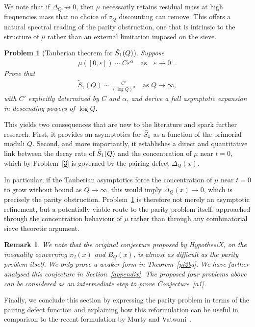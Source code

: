 \documentclass[11pt,reqno]{amsart}
\theoremstyle{plain}\newtheorem{theorem}{Theorem}[section]
\newtheorem{remark}{Remark}[section]
\newtheorem{problem}{Problem}[section]
\numberwithin{equation}{section}
\begin{document}
We note that if $\Delta_Q\not\to 0$, then $\mu$ necessarily retains residual mass at high frequencies mass that no choice of $\sigma_Q$ discounting can remove. This offers a natural spectral reading of the parity obstruction, one that is intrinsic to the structure of $\mu$ rather than an external limitation imposed on the sieve.

\begin{problem}[Tauberian theorem for $\Tilde{S}_1(Q)$]\label{4}
Suppose
\begin{align*}
\mu([0,\varepsilon]) \sim C \varepsilon^\alpha \quad \text{as}\quad \varepsilon \to 0^{+}.    
\end{align*}
Prove that
\begin{align*}
\widetilde{S}_1(Q) \sim \frac{C'}{(\log Q)^\alpha} \quad \text{as } Q \to \infty,    
\end{align*}
with $C'$ explicitly determined by $C$ and $\alpha$, and derive a full asymptotic expansion in descending powers of $\log Q$.    
\end{problem}

\noindent
This yields two consequences that are new to the literature and spark further research. First, it provides an asymptotics for $\Tilde{S}_1$ as a function of the primorial moduli $Q$. Second, and more importantly, it establishes a direct and quantitative link between the decay rate of $\Tilde{S}_1(Q)$ and the concentration of $\mu$ near $t = 0$, which by Problem~\ref{3} is governed by the pairing defect $\Delta_Q(x)$. 

In particular, if the Tauberian asymptotics force the concentration of $\mu$ near $t = 0$ to grow without bound as $Q \to \infty$, this would imply $\Delta_Q(x) \to 0$, which is precisely the parity obstruction. Problem~\ref{4} is therefore not merely an asymptotic refinement, but a potentially viable route to the parity problem itself, approached through the concentration behaviour of $\mu$ rather than through any combinatorial sieve theoretic argument.

\begin{remark}
We note that the original conjecture proposed by HypothesiX, on the inequality concerning $\pi_2(x)$ and $B_Q(x)$, is almost as difficult as the parity problem itself. We only prove a weaker form in Theorem~\ref{pi2bq}. We have further analysed this conjecture in Section~\ref{appendix}. The proposed four problems above can be considered as an intermediate step to prove Conjecture~\ref{a1}.
\end{remark}
\noindent
Finally, we conclude this section by expressing the parity problem in terms of the pairing defect function and explaining how this reformulation can be useful in comparison to the recent formulation by Murty and Vatwani~\cite{murty}.
\end{document}
